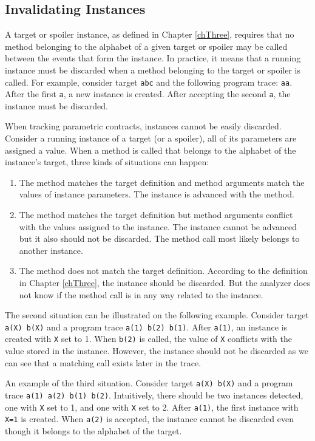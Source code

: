 \subsection{Invalidating Instances}

A target or spoiler instance, as defined in Chapter \ref{chThree}, requires that
no method belonging to the alphabet of a given target or spoiler may be called
between the events that form the instance. In practice, it means that a running
instance must be discarded when a method belonging to the target or spoiler is
called. For example, consider target \texttt{abc} and the following program
trace: \texttt{aa}. After the first \texttt{a}, a new instance is created. After
accepting the second \texttt{a}, the instance must be discarded.

When tracking parametric contracts, instances cannot be easily discarded.
Consider a running instance of a target (or a spoiler), all of its parameters
are assigned a value. When a method is called that belongs to the alphabet of
the instance's target, three kinds of situations can happen:
\begin{enumerate}
    \item The method matches the target definition and method arguments match
        the values of instance parameters. The instance is advanced with the
        method.
    \item The method matches the target definition but method arguments conflict
        with the values assigned to the instance. The instance cannot be
        advanced but it also should not be discarded. The method call most
        likely belongs to another instance.
    \item The method does not match the target definition. According to the
        definition in Chapter \ref{chThree}, the instance should be discarded.
        But the analyzer does not know if the method call is in any way related
        to the instance.
\end{enumerate}

The second situation can be illustrated on the following example. Consider
target \texttt{a(X) b(X)} and a program trace \texttt{a(1) b(2) b(1)}. After
\texttt{a(1)}, an instance is created with \texttt{X} set to 1. When
\texttt{b(2)} is called, the value of \texttt{X} conflicts with the value
stored in the instance. However, the instance should not be discarded as we can
see that a matching call exists later in the trace.

An example of the third situation. Consider target \texttt{a(X) b(X)} and a
program trace \texttt{a(1) a(2) b(1) b(2)}. Intuitively, there should be two
instances detected, one with \texttt{X} set to 1, and one with \texttt{X} set to
2. After \texttt{a(1)}, the first instance with \texttt{X=1} is created. When
\texttt{a(2)} is accepted, the instance cannot be discarded even though it
belongs to the alphabet of the target.

